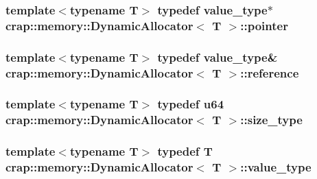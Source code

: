\hypertarget{classcrap_1_1memory_1_1_dynamic_allocator_a281b8cb1ad7cd494edf5f6b67daea60a}{
\subsubsection[{pointer}]{\setlength{\rightskip}{0pt plus 5cm}template$<$typename T$>$ typedef {\bf value\-\_\-type}$\ast$ {\bf crap\-::memory\-::\-Dynamic\-Allocator}$<$ T $>$\-::{\bf pointer}}}\label{classcrap_1_1memory_1_1_dynamic_allocator_a281b8cb1ad7cd494edf5f6b67daea60a}
\hypertarget{classcrap_1_1memory_1_1_dynamic_allocator_ad17b30d2ee05bca34e1a3ea8d212db16}{
\subsubsection[{reference}]{\setlength{\rightskip}{0pt plus 5cm}template$<$typename T$>$ typedef {\bf value\-\_\-type}\& {\bf crap\-::memory\-::\-Dynamic\-Allocator}$<$ T $>$\-::{\bf reference}}}\label{classcrap_1_1memory_1_1_dynamic_allocator_ad17b30d2ee05bca34e1a3ea8d212db16}
\hypertarget{classcrap_1_1memory_1_1_dynamic_allocator_a48b438ee17d8e7a384bde751f72ef17b}{
\subsubsection[{size\-\_\-type}]{\setlength{\rightskip}{0pt plus 5cm}template$<$typename T$>$ typedef {\bf u64} {\bf crap\-::memory\-::\-Dynamic\-Allocator}$<$ T $>$\-::{\bf size\-\_\-type}}}\label{classcrap_1_1memory_1_1_dynamic_allocator_a48b438ee17d8e7a384bde751f72ef17b}
\hypertarget{classcrap_1_1memory_1_1_dynamic_allocator_a6a2ec3aa4d76e563cad6948ce2b563d3}{
\subsubsection[{value\-\_\-type}]{\setlength{\rightskip}{0pt plus 5cm}template$<$typename T$>$ typedef T {\bf crap\-::memory\-::\-Dynamic\-Allocator}$<$ T $>$\-::{\bf value\-\_\-type}}}\label{classcrap_1_1memory_1_1_dynamic_allocator_a6a2ec3aa4d76e563cad6948ce2b563d3}


